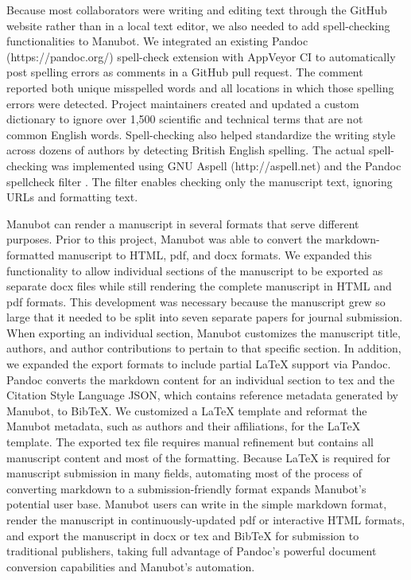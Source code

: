 \documentclass[sigconf]{acmart}
\begin{document}
Because most collaborators were writing and editing text through the GitHub website rather than in a local text editor, we also needed to add spell-checking functionalities to Manubot.
We integrated an existing Pandoc (https://pandoc.org/) spell-check extension with AppVeyor CI to automatically post spelling errors as comments in a GitHub pull request.
The comment reported both unique misspelled words and all locations in which those spelling errors were detected.
Project maintainers created and updated a custom dictionary to ignore over 1,500 scientific and technical terms that are not common English words.
Spell-checking also helped standardize the writing style across dozens of authors by detecting British English spelling.
The actual spell-checking was implemented using GNU Aspell (http://aspell.net) and the Pandoc spellcheck filter \citep{nTjoZqSQ}.
The filter enables checking only the manuscript text, ignoring URLs and formatting text.

Manubot can render a manuscript in several formats that serve different purposes.
Prior to this project, Manubot was able to convert the markdown-formatted manuscript to HTML, pdf, and docx formats.
We expanded this functionality to allow individual sections of the manuscript to be exported as separate docx files while still rendering the complete manuscript in HTML and pdf formats.
This development was necessary because the manuscript grew so large that it needed to be split into seven separate papers for journal submission.
When exporting an individual section, Manubot customizes the manuscript title, authors, and author contributions to pertain to that specific section.
In addition, we expanded the export formats to include partial LaTeX support via Pandoc.
Pandoc converts the markdown content for an individual section to tex and the Citation Style Language JSON, which contains reference metadata generated by Manubot, to BibTeX.
We customized a LaTeX template and reformat the Manubot metadata, such as authors and their affiliations, for the LaTeX template.
The exported tex file requires manual refinement but contains all manuscript content and most of the formatting.
Because LaTeX is required for manuscript submission in many fields, automating most of the process of converting markdown to a submission-friendly format expands Manubot's potential user base.
Manubot users can write in the simple markdown format, render the manuscript in continuously-updated pdf or interactive HTML formats, and export the manuscript in docx or tex and BibTeX for submission to traditional publishers, taking full advantage of Pandoc's powerful document conversion capabilities and Manubot's automation.
\end{document}
